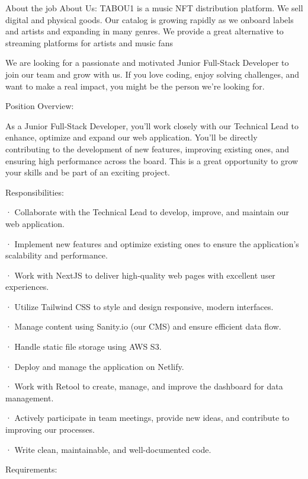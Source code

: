 About the job
About Us: TABOU1 is a music NFT distribution platform. We sell digital and physical goods. Our catalog is growing rapidly as we onboard labels and artists and expanding in many genres. We provide a great alternative to streaming platforms for artists and music fans



We are looking for a passionate and motivated Junior Full-Stack Developer to join our team and grow with us. If you love coding, enjoy solving challenges, and want to make a real impact, you might be the person we’re looking for.



Position Overview:



As a Junior Full-Stack Developer, you’ll work closely with our Technical Lead to enhance, optimize and expand our web application. You’ll be directly contributing to the development of new features, improving existing ones, and ensuring high performance across the board. This is a great opportunity to grow your skills and be part of an exciting project.



Responsibilities:



· Collaborate with the Technical Lead to develop, improve, and maintain our web application.

· Implement new features and optimize existing ones to ensure the application’s scalability and performance.

· Work with NextJS to deliver high-quality web pages with excellent user experiences.

· Utilize Tailwind CSS to style and design responsive, modern interfaces.

· Manage content using Sanity.io (our CMS) and ensure efficient data flow.

· Handle static file storage using AWS S3.

· Deploy and manage the application on Netlify.

· Work with Retool to create, manage, and improve the dashboard for data management.

· Actively participate in team meetings, provide new ideas, and contribute to improving our processes.

· Write clean, maintainable, and well-documented code.



Requirements:



